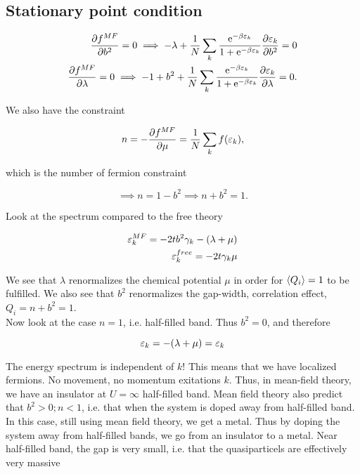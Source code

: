\subsection{Stationary point condition} 

\begin{align*}
    \pdv{f^{MF}}{b^2} = 0 \implies -\lambda + \frac{1}{N}\sum_k \frac{\mathrm{e}^{-\beta \varepsilon_k}}{1 + \mathrm{e}^{-\beta \varepsilon_k}} \pdv{\varepsilon_k}{b^2} = 0 \\
    \pdv{f^{MF}}{\lambda} = 0 \implies -1 + b^2  + \frac{1}{N}\sum_k \frac{\mathrm{e}^{-\beta \varepsilon_k}}{1 + \mathrm{e}^{-\beta \varepsilon_k}} \pdv{\varepsilon_k}{\lambda} = 0. 
\end{align*}

We also have the constraint 

\begin{equation*}
    n = - \pdv{f^{MF}}{\mu} = \frac{1}{N}\sum_k f(\varepsilon_k),
\end{equation*}

which is the number of fermion constraint 

\begin{equation*}
    \implies n = 1 -b^2 \implies n + b^2 = 1.
\end{equation*}

Look at the spectrum compared to the free theory

\begin{align*}
    \varepsilon_k^{MF} = -2tb^2 \gamma_k - (\lambda + \mu) \\
    \varepsilon_k ^{free} = -2t\gamma_k \mu 
\end{align*}

We see that $\lambda$ renormalizes the chemical potential $\mu$ in order for $\expval{Q_i} = 1$ to be fulfilled. We also see that $b^2$ renormalizes the gap-width, correlation effect, $Q_i = n +b^2 = 1$. \\

Now look at the case $n = 1$, i.e. half-filled band. Thus $b^2 = 0$, and therefore 

\begin{equation*}
    \varepsilon_k = -(\lambda + \mu) = \varepsilon_k
\end{equation*}

The energy spectrum is independent of $k$! This means that we have localized fermions. No movement, no momentum exitations $k$. Thus, in mean-field theory, we have an insulator at $U = \infty$ half-filled band. Mean field theory also predict that $b^2 > 0 ; n < 1$, i.e. that when the system is doped away from half-filled band. In this case, still using mean field theory, we get a metal. Thus by doping the system away from half-filled bands, we go from an insulator to a metal. Near half-filled band, the gap is very small, i.e. that the quasiparticels are effectively very massive 

